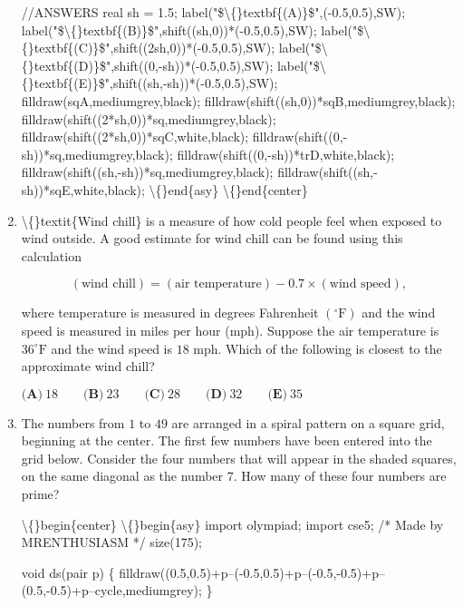 \documentclass{article}
\begin{document}
\begin{enumerate}[label=\arabic*., itemsep=0.5em]
//ANSWERS
real sh = 1.5;
label("\$\textbackslash\{\}textbf\{(A)\}\$",(-0.5,0.5),SW);
label("\$\textbackslash\{\}textbf\{(B)\}\$",shift((sh,0))*(-0.5,0.5),SW);
label("\$\textbackslash\{\}textbf\{(C)\}\$",shift((2sh,0))*(-0.5,0.5),SW);
label("\$\textbackslash\{\}textbf\{(D)\}\$",shift((0,-sh))*(-0.5,0.5),SW);
label("\$\textbackslash\{\}textbf\{(E)\}\$",shift((sh,-sh))*(-0.5,0.5),SW);
filldraw(sqA,mediumgrey,black);
filldraw(shift((sh,0))*sqB,mediumgrey,black);
filldraw(shift((2*sh,0))*sq,mediumgrey,black);
filldraw(shift((2*sh,0))*sqC,white,black);
filldraw(shift((0,-sh))*sq,mediumgrey,black);
filldraw(shift((0,-sh))*trD,white,black);
filldraw(shift((sh,-sh))*sq,mediumgrey,black);
filldraw(shift((sh,-sh))*sqE,white,black);
\textbackslash\{\}end\{asy\}
\textbackslash\{\}end\{center\}
\par \vspace{0.5em}\item \textbackslash\{\}textit\{Wind chill\} is a measure of how cold people feel when exposed to wind outside. A good estimate for wind chill can be found using this calculation

\begin{equation*}
(\text{wind chill}) = (\text{air temperature}) - 0.7 \times (\text{wind speed}),
\end{equation*}

where temperature is measured in degrees Fahrenheit \((^{\circ}\text{F})\) and the wind speed is measured in miles per hour (mph). Suppose the air temperature is \(36^{\circ}\text{F} \) and the wind speed is \(18\) mph. Which of the following is closest to the approximate wind chill?

\(\textbf{(A)}\ 18 \qquad \textbf{(B)}\ 23 \qquad \textbf{(C)}\ 28 \qquad \textbf{(D)}\ 32 \qquad \textbf{(E)}\ 35\)\par \vspace{0.5em}\item The numbers from \(1\) to \(49\) are arranged in a spiral pattern on a square grid, beginning at the center. The first few numbers have been entered into the grid below. Consider the four numbers that will appear in the shaded squares, on the same diagonal as the number \(7.\) How many of these four numbers are prime?

\textbackslash\{\}begin\{center\}
\textbackslash\{\}begin\{asy\}
import olympiad;
import cse5;
/* Made by MRENTHUSIASM */
size(175);

void ds(pair p) \{
	filldraw((0.5,0.5)+p--(-0.5,0.5)+p--(-0.5,-0.5)+p--(0.5,-0.5)+p--cycle,mediumgrey);
\}


\end{enumerate}
\end{document}
